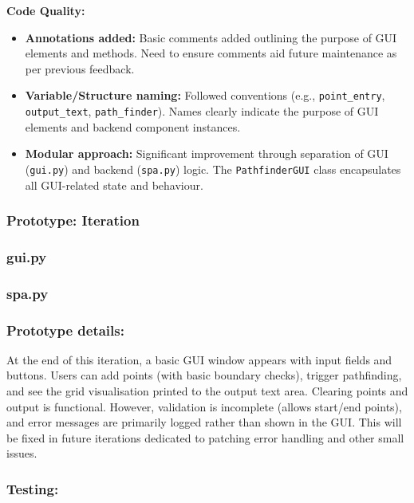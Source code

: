 \textbf{Code Quality:}
\begin{itemize}
	\item \textbf{Annotations added:} Basic comments added outlining the purpose of GUI elements and methods. Need to ensure comments aid future maintenance as per previous feedback.
	\item \textbf{Variable/Structure naming:} Followed conventions (e.g., \verb|point_entry|, \verb|output_text|, \verb|path_finder|). Names clearly indicate the purpose of GUI elements and backend component instances.
	\item \textbf{Modular approach:} Significant improvement through separation of GUI (\verb|gui.py|) and backend (\verb|spa.py|) logic. The \verb|PathfinderGUI| class encapsulates all GUI-related state and behaviour.
\end{itemize}

\newpage %

\subsubsection*{Prototype: Iteration}
\subsubsection{gui.py}


\subsubsection{spa.py}


\newpage %

\subsubsection{Prototype details:}
At the end of this iteration, a basic GUI window appears with input fields and buttons. Users can add points (with basic boundary checks), trigger pathfinding, and see the grid visualisation printed to the output text area. Clearing points and output is functional. However, validation is incomplete (allows start/end points), and error messages are primarily logged rather than shown in the GUI. This will be fixed in future iterations dedicated to patching error handling and other small issues.

\subsubsection{Testing:}


